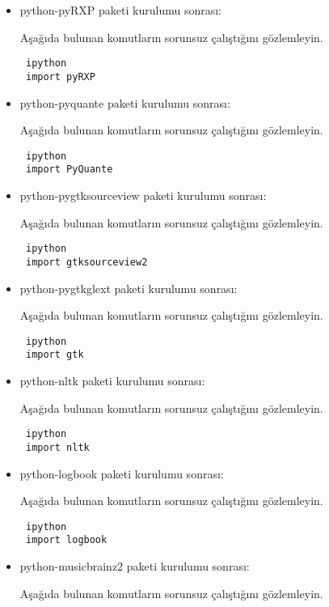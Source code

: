 \documentclass[a4paper,10pt]{article}
\begin{document}
\begin{itemize}
\item python-pyRXP paketi kurulumu sonrası:

Aşağıda bulunan komutların sorunsuz çalıştığını gözlemleyin.

\begin{verbatim}
 ipython
 import pyRXP
\end{verbatim}

\item python-pyquante paketi kurulumu sonrası:

Aşağıda bulunan komutların sorunsuz çalıştığını gözlemleyin.

\begin{verbatim}
 ipython
 import PyQuante
\end{verbatim}

\item python-pygtksourceview paketi kurulumu sonrası:

Aşağıda bulunan komutların sorunsuz çalıştığını gözlemleyin.

\begin{verbatim}
 ipython
 import gtksourceview2
\end{verbatim}

\item python-pygtkglext paketi kurulumu sonrası:

Aşağıda bulunan komutların sorunsuz çalıştığını gözlemleyin.

\begin{verbatim}
 ipython
 import gtk
\end{verbatim}

\item python-nltk paketi kurulumu sonrası:

Aşağıda bulunan komutların sorunsuz çalıştığını gözlemleyin.

\begin{verbatim}
 ipython
 import nltk
\end{verbatim}

\item python-logbook paketi kurulumu sonrası:

Aşağıda bulunan komutların sorunsuz çalıştığını gözlemleyin.

\begin{verbatim}
 ipython
 import logbook
\end{verbatim}

\item python-musicbrainz2 paketi kurulumu sonrası:

Aşağıda bulunan komutların sorunsuz çalıştığını gözlemleyin.


\end{itemize}
\end{document}
